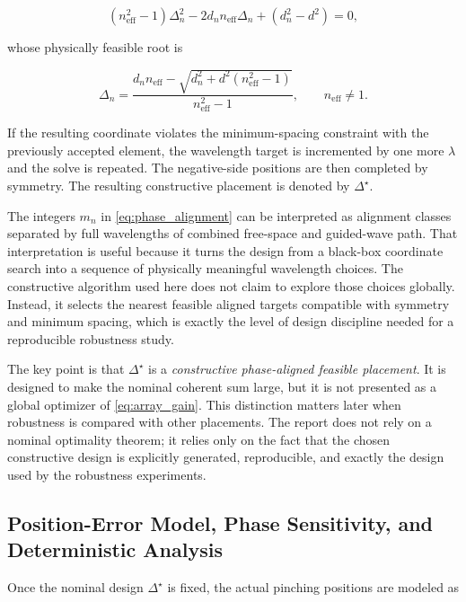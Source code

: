 \begin{equation}
(n_{\mathrm{eff}}^2 - 1)\Delta_n^2 - 2 d_n n_{\mathrm{eff}} \Delta_n + (d_n^2 - d^2) = 0,
\label{eq:constructive_quadratic}
\end{equation}

whose physically feasible root is

\begin{equation}
\Delta_n
= \frac{d_n n_{\mathrm{eff}} - \sqrt{d_n^2 + d^2(n_{\mathrm{eff}}^2 - 1)}}{n_{\mathrm{eff}}^2 - 1},
\qquad n_{\mathrm{eff}} \ne 1.
\label{eq:constructive_root}
\end{equation}

If the resulting coordinate violates the minimum-spacing constraint with the previously accepted element, the wavelength target is incremented by one more $\lambda$ and the solve is repeated. The negative-side positions are then completed by symmetry. The resulting constructive placement is denoted by $\Delta^\star$.

The integers $m_n$ in \eqref{eq:phase_alignment} can be interpreted as alignment classes separated by full wavelengths of combined free-space and guided-wave path. That interpretation is useful because it turns the design from a black-box coordinate search into a sequence of physically meaningful wavelength choices. The constructive algorithm used here does not claim to explore those choices globally. Instead, it selects the nearest feasible aligned targets compatible with symmetry and minimum spacing, which is exactly the level of design discipline needed for a reproducible robustness study.

The key point is that $\Delta^\star$ is a \emph{constructive phase-aligned feasible placement}. It is designed to make the nominal coherent sum large, but it is not presented as a global optimizer of \eqref{eq:array_gain}. This distinction matters later when robustness is compared with other placements. The report does not rely on a nominal optimality theorem; it relies only on the fact that the chosen constructive design is explicitly generated, reproducible, and exactly the design used by the robustness experiments.

\subsection{Position-Error Model, Phase Sensitivity, and Deterministic Analysis}

Once the nominal design $\Delta^\star$ is fixed, the actual pinching positions are modeled as

